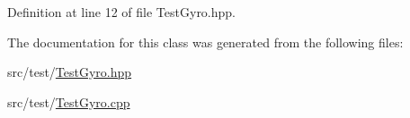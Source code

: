 Definition at line 12 of file Test\-Gyro.\-hpp.



The documentation for this class was generated from the following files\-:\begin{DoxyCompactItemize}
\item 
src/test/\hyperlink{TestGyro_8hpp}{Test\-Gyro.\-hpp}\item 
src/test/\hyperlink{TestGyro_8cpp}{Test\-Gyro.\-cpp}\end{DoxyCompactItemize}
